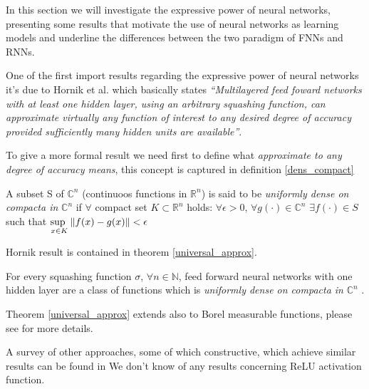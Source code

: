 In this section we will investigate the expressive power of neural networks, presenting some results that motivate the use of neural networks as learning
models and underline the differences between the two paradigm of FNNs and RNNs. 

One of the first import results regarding the expressive power of neural networks it's due to Hornik et al. \cite{Hornik89} which basically states
\textit{``Multilayered feed foward networks with at least one hidden layer, using an arbitrary squashing function, can approximate virtually any function
of interest to any desired degree of accuracy provided sufficiently many hidden units are available''}.

To give a more formal result we need first to define what \textit{approximate to any degree of accuracy means}, this concept is captured in definition
\ref{dens_compact}
 
\begin{defn}
 A subset S of $\mathbb{C}^n$ (continuoos functions in $\mathbb{R}^n$) is said to be \textit{uniformly dense on compacta in} $\mathbb{C}^n$ if $\forall$
 compact set $K\subset \mathbb{R}^n$ holds: $\forall \epsilon >0$, $\forall g(\cdot) \in \mathbb{C}^n$ $\exists f(\cdot) \in S$ such that 
 $\underset{x \in K}{\text{sup  }} \left\Vert f(x)-g(x) \right\Vert<\epsilon$ 
 \label{dens_compact}
\end{defn}

Hornik result is contained in theorem \ref{universal_approx}.
\begin{thm}
 For every squashing function $\sigma$, $\forall n\in \mathbb{N}$, feed forward neural
 networks with one hidden layer are a class of functions which is \textit{uniformly dense on compacta in} $\mathbb{C}^n$
\label{universal_approx}.
\end{thm}

Theorem \ref{universal_approx} extends also to Borel measurable functions, please see \cite{Hornik89} for more details.

A survey of other approaches, some of which constructive, which achieve similar results can be found in \cite{Scarselli98}
We don't know of any results concerning ReLU activation function.

